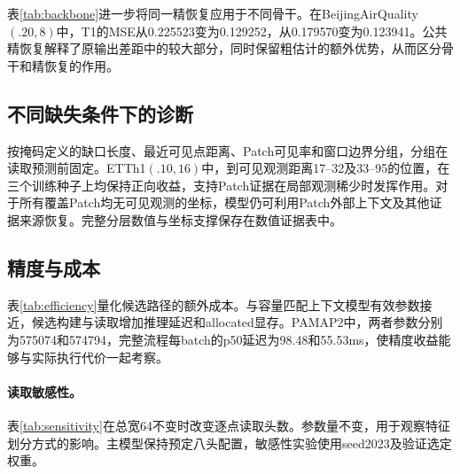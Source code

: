 表\ref{tab:backbone}进一步将同一精恢复应用于不同骨干。在BeijingAirQuality$(.20,8)$中，T1的MSE从0.225523变为0.129252，\Model{}从0.179570变为0.123941。公共精恢复解释了原输出差距中的较大部分，同时保留\Model{}粗估计的额外优势，从而区分骨干和精恢复的作用。

\begin{table}[t]
 \centering\small\setlength{\tabcolsep}{4pt}
 
 \caption{BeijingAirQuality$(.20,8)$上三个冻结骨干接相同结构、相同预算精恢复的结果，seed2023，二十组测试遮挡。粗精误差在相同位置评价。}
 \label{tab:backbone}
\end{table}

\subsection{不同缺失条件下的诊断}
按掩码定义的缺口长度、最近可见点距离、Patch可见率和窗口边界分组，分组在读取预测前固定。ETTh1$(.10,16)$中，到可见观测距离17--32及33--95的位置，在三个训练种子上均保持正向收益，支持Patch证据在局部观测稀少时发挥作用。对于所有覆盖Patch均无可见观测的坐标，模型仍可利用Patch外部上下文及其他证据来源恢复。完整分层数值与坐标支撑保存在数值证据表中。

\subsection{精度与成本}
表\ref{tab:efficiency}量化候选路径的额外成本。\Model{}与容量匹配上下文模型有效参数接近，候选构建与读取增加推理延迟和allocated显存。PAMAP2中，两者参数分别为575074和574794，完整流程每batch的p50延迟为98.48和55.53ms，使精度收益能够与实际执行代价一起考察。

\begin{table}[t]
 \centering\small\setlength{\tabcolsep}{5pt}
 
 \caption{选定seed2023模型的推理成本；同一独占RTX5090、FP32、batch128，二十次预热后进行一百次同步测量。显存为峰值allocated。}
 \label{tab:efficiency}
\end{table}

\paragraph{读取敏感性。}
表\ref{tab:sensitivity}在总宽64不变时改变逐点读取头数。参数量不变，用于观察特征划分方式的影响。主模型保持预定八头配置，敏感性实验使用seed2023及验证选定权重。

\begin{table}[t]
 \centering\small\setlength{\tabcolsep}{5pt}
 
 \caption{ETTh1$(.10,16)$上的逐点读取头数敏感性，总宽64，seed2023，每模型二十组共享测试遮挡。}
 \label{tab:sensitivity}
\end{table}
